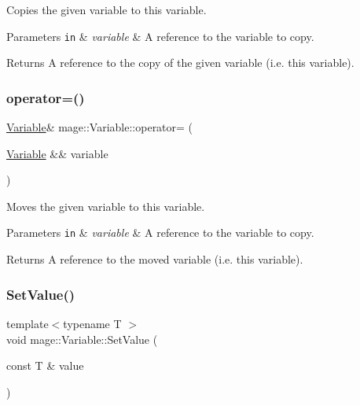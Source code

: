 Copies the given variable to this variable.


\begin{DoxyParams}[1]{Parameters}
\mbox{\tt in}  & {\em variable} & A reference to the variable to copy. \\
\hline
\end{DoxyParams}
\begin{DoxyReturn}{Returns}
A reference to the copy of the given variable (i.\+e. this variable). 
\end{DoxyReturn}
\hypertarget{structmage_1_1_variable_aec9505fabbafb48e9fcbf9d9213147ce}{}\label{structmage_1_1_variable_aec9505fabbafb48e9fcbf9d9213147ce} 
\subsubsection{\texorpdfstring{operator=()}{operator=()}\hspace{0.1cm}{\footnotesize\ttfamily [2/2]}}
{\footnotesize\ttfamily \hyperlink{structmage_1_1_variable}{Variable}\& mage\+::\+Variable\+::operator= (\begin{DoxyParamCaption}\item[{\hyperlink{structmage_1_1_variable}{Variable} \&\&}]{variable }\end{DoxyParamCaption})\hspace{0.3cm}{\ttfamily [default]}}

Moves the given variable to this variable.


\begin{DoxyParams}[1]{Parameters}
\mbox{\tt in}  & {\em variable} & A reference to the variable to copy. \\
\hline
\end{DoxyParams}
\begin{DoxyReturn}{Returns}
A reference to the moved variable (i.\+e. this variable). 
\end{DoxyReturn}
\hypertarget{structmage_1_1_variable_ab3b2bfdc631a8174c9a5c0360a4fee30}{}\label{structmage_1_1_variable_ab3b2bfdc631a8174c9a5c0360a4fee30} 
\subsubsection{\texorpdfstring{Set\+Value()}{SetValue()}}
{\footnotesize\ttfamily template$<$typename T $>$ \\
void mage\+::\+Variable\+::\+Set\+Value (\begin{DoxyParamCaption}\item[{const T \&}]{value }\end{DoxyParamCaption})}

